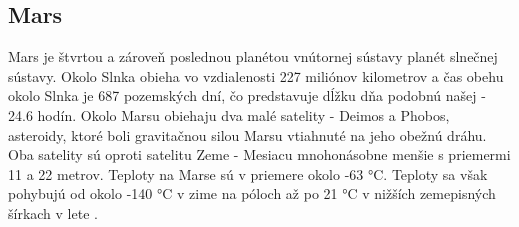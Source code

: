 \subsection{Mars}
Mars je štvrtou a zároveň poslednou planétou vnútornej sústavy planét slnečnej sústavy. Okolo Slnka obieha vo vzdialenosti 227 miliónov kilometrov a čas obehu okolo Slnka je 687 pozemských dní, čo predstavuje dĺžku dňa podobnú našej - 24.6 hodín. Okolo Marsu obiehaju dva malé satelity - Deimos a Phobos, asteroidy, ktoré boli gravitačnou silou Marsu vtiahnuté na jeho obežnú dráhu. Oba satelity sú oproti satelitu Zeme - Mesiacu mnohonásobne menšie s priemermi 11 a 22 metrov. Teploty na Marse sú v priemere okolo -63 °C. Teploty sa však pohybujú od okolo -140 °C v zime na póloch až po 21 °C v nižších zemepisných šírkach v lete \cite{pocasie_mars}.

